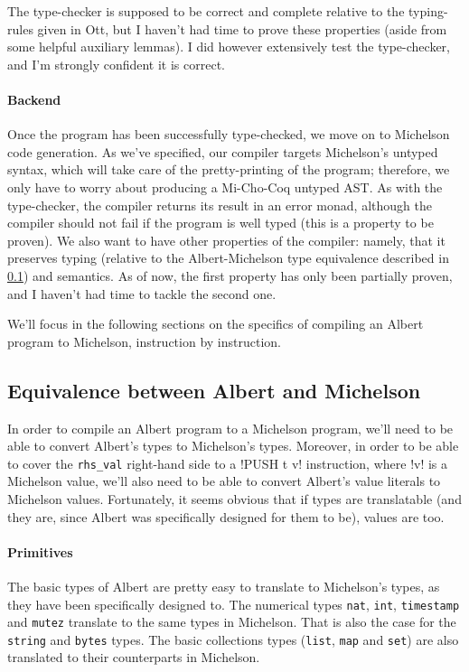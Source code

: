 \documentclass{report}
\begin{document}
The type-checker is supposed to be correct and complete relative to the typing-rules given in Ott, but I haven't had time to prove these properties (aside from some helpful auxiliary lemmas). I did however extensively test the type-checker, and I'm strongly confident it is correct.

\paragraph{Backend}

Once the program has been successfully type-checked, we move on to Michelson code generation. As we've specified, our compiler targets Michelson's untyped syntax, which will take care of the pretty-printing of the program; therefore, we only have to worry about producing a Mi-Cho-Coq untyped AST. As with the type-checker, the compiler returns its result in an error monad, although the compiler should not fail if the program is well typed (this is a property to be proven). We also want to have other properties of the compiler: namely, that it preserves typing (relative to the Albert-Michelson type equivalence described in \ref{alberteqmichelson}) and semantics. As of now, the first property has only been partially proven, and I haven't had time to tackle the second one.

We'll focus in the following sections on the specifics of compiling an Albert program to Michelson, instruction by instruction.

\subsection{Equivalence between Albert and Michelson}
\label{alberteqmichelson}

In order to compile an Albert program to a Michelson program, we'll need to be able to convert Albert's types to Michelson's types. Moreover, in order to be able to cover the \texttt{rhs\_val} right-hand side to a !PUSH t v! instruction, where !v! is a Michelson value, we'll also need to be able to convert Albert's value literals to Michelson values. Fortunately, it seems obvious that if types are translatable (and they are, since Albert was specifically designed for them to be), values are too.

\paragraph{Primitives}

The basic types of Albert are pretty easy to translate to Michelson's types, as they have been specifically designed to. The numerical types \texttt{nat}, \texttt{int}, \texttt{timestamp} and \texttt{mutez} translate to the same types in Michelson. That is also the case for the \texttt{string} and \texttt{bytes} types. The basic collections types (\texttt{list}, \texttt{map} and \texttt{set}) are also translated to their counterparts in Michelson.
\end{document}
